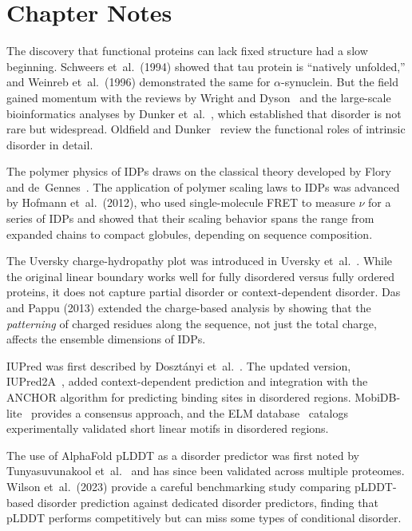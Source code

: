\section*{Chapter Notes}
\label{sec:disorder-notes}

The discovery that functional proteins can lack fixed structure had a slow beginning.
Schweers et~al.\ (1994) showed that tau protein is ``natively unfolded,'' and Weinreb
et~al.\ (1996) demonstrated the same for $\alpha$-synuclein.  But the field gained momentum
with the reviews by Wright and Dyson~\cite{wright1999} and the large-scale bioinformatics
analyses by Dunker et~al.~\cite{dunker2001}, which established that disorder is not rare but
widespread.  Oldfield and Dunker~\cite{oldfield2014} review the functional roles of
intrinsic disorder in detail.

The polymer physics of IDPs draws on the classical theory developed by
Flory~\cite{flory1969} and de~Gennes~\cite{degennes1979}.  The application of polymer
scaling laws to IDPs was advanced by Hofmann et~al.\ (2012), who used single-molecule FRET
to measure $\nu$ for a series of IDPs and showed that their scaling behavior spans the range
from expanded chains to compact globules, depending on sequence composition.

The Uversky charge-hydropathy plot was introduced in Uversky et~al.~\cite{uversky2000}.
While the original linear boundary works well for fully disordered versus fully ordered
proteins, it does not capture partial disorder or context-dependent disorder.  Das and Pappu
(2013) extended the charge-based analysis by showing that the \textit{patterning} of charged
residues along the sequence, not just the total charge, affects the ensemble dimensions of
IDPs.

IUPred was first described by Doszt\'anyi et~al.~\cite{dosztanyi2005}.  The updated version,
IUPred2A~\cite{meszaros2018}, added context-dependent prediction and integration with the
ANCHOR algorithm for predicting binding sites in disordered regions.
MobiDB-lite~\cite{necci2021} provides a consensus approach, and the ELM
database~\cite{davey2012} catalogs experimentally validated short linear motifs in disordered
regions.

The use of AlphaFold pLDDT as a disorder predictor was first noted by Tunyasuvunakool
et~al.~\cite{tunyasuvunakool2021} and has since been validated across multiple proteomes.
Wilson et~al.\ (2023) provide a careful benchmarking study comparing pLDDT-based disorder
prediction against dedicated disorder predictors, finding that pLDDT performs competitively
but can miss some types of conditional disorder.


